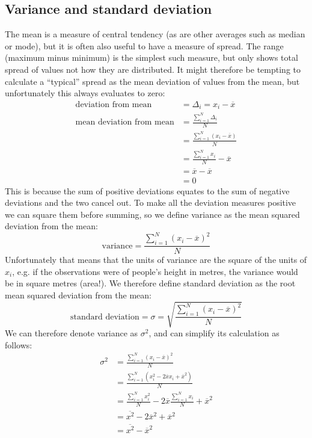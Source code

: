 \documentclass[11pt,a4paper]{article}
\begin{document}
\subsection{Variance and standard deviation}
The mean is a measure of central tendency (as are other averages such as median or mode), but it is often also
useful to have a measure of spread. The range (maximum minus minimum) is the simplest such measure, but only
shows total spread of values not how they are distributed. It might therefore be tempting to calculate a ``typical'' spread as the mean
deviation of values from the mean, but unfortunately this always evaluates to zero:
\begin{align*}
\text{deviation from mean} &= \Delta_i = x_i - \overline{x} \\
\text{mean deviation from mean} &= \frac{\sum\limits_{i=1}^{N}\Delta_i}{N} \\
                                &= \frac{\sum\limits_{i=1}^{N}(x_i - \overline{x})}{N} \\
                                &= \frac{\sum\limits_{i=1}^{N}x_i}{N} - \overline{x} \\
                                &= \overline{x} - \overline{x} \\
                                &= 0
\end{align*}
This is because the sum of positive deviations equates to the sum of negative deviations and
the two cancel out. To make all the
deviation measures positive we can square them before summing, so we define variance as the mean squared
deviation from the mean:
\begin{equation*}
\text{variance} = \frac{\sum\limits_{i=1}^{N}(x_i - \overline{x})^2}{N}
\end{equation*}
Unfortunately that means that the units of variance are the square of the units of $x_i$, e.g. if the observations
were of people's height in metres, the variance would be in square metres (area!). We therefore define standard
deviation as the root mean squared deviation from the mean:
\begin{equation*}
\text{standard deviation} = \sigma = \sqrt{\frac{\sum\limits_{i=1}^{N}(x_i - \overline{x})^2}{N}}
\end{equation*}
We can therefore denote variance as $\sigma^2$, and can simplify its calculation as follows:
\begin{align*}
\sigma^2 &= \frac{\sum\limits_{i=1}^{N}(x_i - \overline{x})^2}{N} \\
         &= \frac{\sum\limits_{i=1}^{N}(x_i^2 - 2\overline{x}x_i + \overline{x}^2)}{N} \\
         &= \frac{\sum\limits_{i=1}^{N}x_i^2}{N} - 2\overline{x}\frac{\sum\limits_{i=1}^{N}x_i}{N} + \overline{x}^2 \\
         &= \overline{x^2} - 2\overline{x}^2 + \overline{x}^2 \\
         &= \overline{x^2} - \overline{x}^2
\end{align*}
\end{document}
